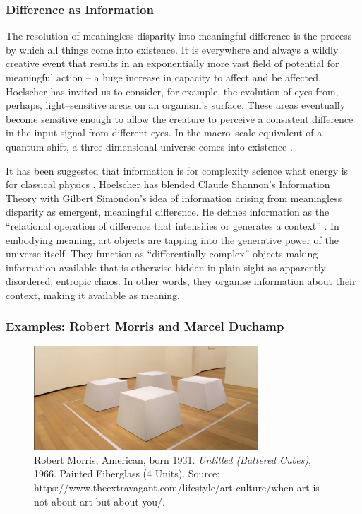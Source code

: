 \documentclass[letterpaper]{article}
\begin{document}
    \subsubsection{Difference as Information}

    The resolution of meaningless disparity into meaningful difference is the process by which all things come into existence. It is everywhere and always a wildly creative event that results in an exponentially more vast field of potential for meaningful action – a huge increase in capacity to affect and be affected. Hoelscher has invited us to consider, for example, the evolution of eyes from, perhaps, light–sensitive areas on an organism's surface. These areas eventually become sensitive enough to allow the creature to perceive a consistent difference in the input signal from different eyes. In the macro–scale equivalent of a quantum shift, a three dimensional universe comes into existence \citep[p.5]{HoelscherArtAsInfrmtn2021}.

    It has been suggested that information is for complexity science what energy is for classical physics \citep[0:52]{CrutchfieldIntrdctnToCmplxty2018} \citep{CrutfieldRtAlSgntrsOfInfnty2015}. Hoelscher has blended Claude Shannon's Information Theory with Gilbert Simondon's idea of information arising from meaningless disparity as emergent, meaningful difference. He defines information as the “relational operation of difference that intensifies or generates a context” \citep[p.6]{HoelscherArtAsInfrmtn2021}. In embodying meaning, art objects are tapping into the generative power of the universe itself. They function as “differentially complex” \citep[p.74]{HoelscherArtAsInfrmtn2021} objects making information available that is otherwise hidden in plain sight as apparently disordered, entropic chaos. In other words, they organise information about their context, making it available as meaning.

    \subsubsection{Examples: Robert Morris and Marcel Duchamp}

    \begin{figure}[h]
    \includegraphics[width=3.31in]{robert-morris-cubes.png}
    \caption{Robert Morris, American, born 1931. \emph{Untitled (Battered Cubes)}, 1966. Painted Fiberglass (4 Units). Source: https://www.theextravagant.com/lifestyle/art-culture/when-art-is-not-about-art-but-about-you/.}
    \end{figure}
\end{document}
